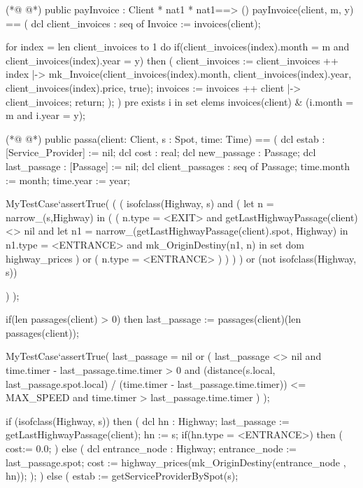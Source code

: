\begin{vdmpp}[breaklines=true]
(*@
\label{payInvoice:153}
@*)
  public payInvoice : Client * nat1 * nat1==> ()
  payInvoice(client, m, y) == (
   dcl client_invoices : seq of Invoice := invoices(client);
   
   for index = len client_invoices to 1 do
   if(client_invoices(index).month = m and client_invoices(index).year = y) then
   (
    client_invoices := client_invoices ++ { index |-> mk_Invoice(client_invoices(index).month, client_invoices(index).year, client_invoices(index).price, true)};
    invoices := invoices ++ {client |-> client_invoices};
    return;
   );
  )
  pre
   exists i in set elems invoices(client) & (i.month = m and i.year = y);
   
(*@
\label{passa:168}
@*)
  public passa(client: Client, s : Spot, time: Time) == (
   dcl estab : [Service_Provider] := nil;
   dcl cost : real;
   dcl new_passage : Passage;
   dcl last_passage : [Passage] := nil;
   dcl client_passages : seq of Passage;
   time.month := month;
   time.year := year;
   
   MyTestCase`assertTrue(
    (
     (
      isofclass(Highway, s) 
     and 
     (
      let n  = narrow_(s,Highway) in 
      (
       (
        n.type = <EXIT>
        and
        getLastHighwayPassage(client) <> nil
        and
        let n1 = narrow_(getLastHighwayPassage(client).spot, Highway) in 
        n1.type = <ENTRANCE>
        and 
        mk_OriginDestiny(n1, n) in set dom highway_prices
       )
       or
       (
        n.type = <ENTRANCE>
       )
      )
     )
    )
    or (not isofclass(Highway, s))
    
   )
  );
  
  if(len passages(client) > 0) then
   last_passage := passages(client)(len passages(client));

  MyTestCase`assertTrue(
   last_passage = nil
   or
   (
    last_passage <> nil
    and 
    time.timer - last_passage.time.timer > 0
    and
     (distance(s.local, last_passage.spot.local) / (time.timer - last_passage.time.timer)) <= MAX_SPEED
     and time.timer > last_passage.time.timer
    )
  );
   
   if (isofclass(Highway, s)) then
  ( 
   dcl hn : Highway;
   last_passage := getLastHighwayPassage(client);
   hn := s;
   if(hn.type = <ENTRANCE>) then
    (
    cost:= 0.0;
    )
   else
   (
    dcl entrance_node : Highway;
    entrance_node := last_passage.spot;
    cost := highway_prices(mk_OriginDestiny(entrance_node , hn));
   );
  )
   else
   (
    estab := getServiceProviderBySpot(s);
          

\end{vdmpp}
